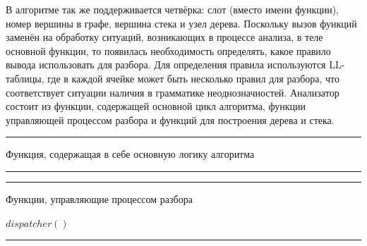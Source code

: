 В алгоритме так же поддерживается четвёрка: слот (вместо имени функции), номер вершины в графе, вершина стека и узел дерева. Поскольку вызов функций заменён на обработку ситуаций, возникающих в процессе анализа, в теле основной функции, то появилась необходимость определять, какое правило вывода использовать для разбора. Для определения правила используются LL-таблицы, где в каждой ячейке может быть несколько правил для разбора, что соответствует ситуации наличия в грамматике неоднозначностей. Анализатор состоит из функции, содержащей основной цикл алгоритма, функции управляющей процессом разбора и функций для построения дерева и стека.

\begin{listing}[H]
\hrule
\begin{algorithmic}
\caption{Функция, содержащая в себе основную логику алгоритма}
\label{parsing}
    \Else
				\EndIf
			\Else
					\EndFor
				\EndFor	
			\EndIf
		\Else
		\EndIf
    \EndIf
\EndFunction
\end{algorithmic}

\hrule
\end{listing}

\begin{listing}
\hrule
\begin{algorithmic}
\caption{Функции, управляющие процессом разбора }
\label{control}
		 {$dispatcher()$}
		\EndIf
	\EndWhile
\EndFunction

    \Else
    \EndIf
\EndFunction
\end{algorithmic}
\hrule
\end{listing}

